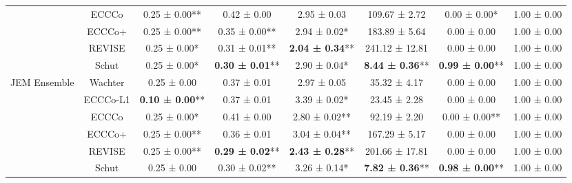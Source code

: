 \begin{table}
{\begin{tabular}[t]{cccccccc}
 & ECCCo & 0.25 ± 0.00** & 0.42 ± 0.00\hphantom{*}\hphantom{*} & 2.95 ± 0.03\hphantom{*}\hphantom{*} & 109.67 ± 2.72\hphantom{*}\hphantom{*} & 0.00 ± 0.00*\hphantom{*} & 1.00 ± 0.00\hphantom{*}\hphantom{*}\\

 & ECCCo+ & 0.25 ± 0.00** & 0.35 ± 0.00** & 2.94 ± 0.02*\hphantom{*} & 183.89 ± 5.64\hphantom{*}\hphantom{*} & 0.00 ± 0.00\hphantom{*}\hphantom{*} & 1.00 ± 0.00\hphantom{*}\hphantom{*}\\

 & REVISE & 0.25 ± 0.00*\hphantom{*} & 0.31 ± 0.01** & \textbf{2.04 ± 0.34}** & 241.12 ± 12.81\hphantom{*}\hphantom{*} & 0.00 ± 0.00\hphantom{*}\hphantom{*} & 1.00 ± 0.00\hphantom{*}\hphantom{*}\\

 & Schut & 0.25 ± 0.00*\hphantom{*} & \textbf{0.30 ± 0.01}** & 2.90 ± 0.04*\hphantom{*} & \textbf{8.44 ± 0.36}** & \textbf{0.99 ± 0.00}** & 1.00 ± 0.00\hphantom{*}\hphantom{*}\\

\multirow[t]{-6}{*}{\centering\arraybackslash JEM Ensemble} & Wachter & 0.25 ± 0.00\hphantom{*}\hphantom{*} & 0.37 ± 0.01\hphantom{*}\hphantom{*} & 2.97 ± 0.05\hphantom{*}\hphantom{*} & 35.32 ± 4.17\hphantom{*}\hphantom{*} & 0.00 ± 0.00\hphantom{*}\hphantom{*} & 1.00 ± 0.00\hphantom{*}\hphantom{*}\\
\cmidrule{1-8}
 & ECCCo-L1 & \textbf{0.10 ± 0.00}** & 0.37 ± 0.01\hphantom{*}\hphantom{*} & 3.39 ± 0.02*\hphantom{*} & 23.45 ± 2.28\hphantom{*}\hphantom{*} & 0.00 ± 0.00\hphantom{*}\hphantom{*} & 1.00 ± 0.00\hphantom{*}\hphantom{*}\\

 & ECCCo & 0.25 ± 0.00*\hphantom{*} & 0.41 ± 0.00\hphantom{*}\hphantom{*} & 2.80 ± 0.02** & 92.19 ± 2.20\hphantom{*}\hphantom{*} & 0.00 ± 0.00** & 1.00 ± 0.00\hphantom{*}\hphantom{*}\\

 & ECCCo+ & 0.25 ± 0.00** & 0.36 ± 0.01\hphantom{*}\hphantom{*} & 3.04 ± 0.04** & 167.29 ± 5.17\hphantom{*}\hphantom{*} & 0.00 ± 0.00\hphantom{*}\hphantom{*} & 1.00 ± 0.00\hphantom{*}\hphantom{*}\\

 & REVISE & 0.25 ± 0.00** & \textbf{0.29 ± 0.02}** & \textbf{2.43 ± 0.28}** & 201.66 ± 17.81\hphantom{*}\hphantom{*} & 0.00 ± 0.00\hphantom{*}\hphantom{*} & 1.00 ± 0.00\hphantom{*}\hphantom{*}\\

 & Schut & 0.25 ± 0.00\hphantom{*}\hphantom{*} & 0.30 ± 0.02** & 3.26 ± 0.14*\hphantom{*} & \textbf{7.82 ± 0.36}** & \textbf{0.98 ± 0.00}** & 1.00 ± 0.00\hphantom{*}\hphantom{*}\\


\end{tabular}}
\end{table}
